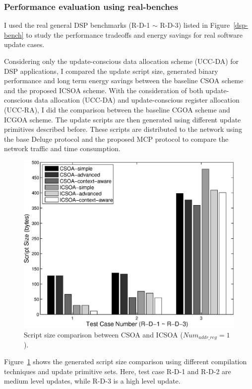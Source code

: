 \subsubsection{Performance evaluation using real-benches}
I used the real general DSP benchmarks (R-D-1 $\sim$ R-D-3)
listed in Figure~\ref{dsp-bench} to study the performance tradeoffs and
energy savings for real software update cases.

Considering only the update-conscious data allocation scheme (UCC-DA) for DSP applications,
I compared the update script size, generated binary performance and long term energy savings
between the baseline CSOA scheme and the proposed ICSOA scheme.
With the consideration of both update-conscious data allocation (UCC-DA) and update-conscious
register allocation (UCC-RA), I did the comparison between the baseline CGOA scheme and ICGOA scheme.
The update scripts are then generated using different update primitives described before. These scripts are distributed to the network using the base Deluge protocol and the proposed MCP protocol to compare the network traffic and time consumption.

\begin{figure}[htbp]
\centering
\includegraphics[scale=0.6]{./figures/update2.eps}
\caption{Script size comparison between CSOA and ICSOA ($Num_{addr\_reg} = 1$).}
\label{update-dsp-real}
\vspace{-0.1in}
\end{figure}

Figure~\ref{update-dsp-real} shows the generated script size comparison using different compilation techniques 
and update primitive sets. Here, test case R-D-1 and R-D-2 are medium level updates, while R-D-3 is a high level update. 


